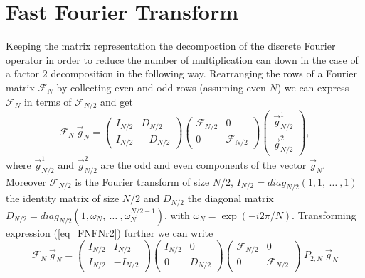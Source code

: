 \section{Fast Fourier Transform} 
\label{sec_fft}
%
Keeping the matrix representation the decompostion of the
discrete Fourier operator in order to reduce the number 
of multiplication can down in the case of a factor $2$
decomposition in the following way.
Rearranging the rows of a Fourier matrix $\mathcal{F}_{N}$
by collecting even and odd rows (assuming even $N$) we
can express $\mathcal{F}_N$ in terms of $\mathcal{F}_{N/2}$
and get
\begin{equation}  \label{eq_FNFNr2}
 \mathcal{F}_{N} \ \vec{g}_{N} 
  =
 \left(
  \begin{array}{cr}
   I_{N/2} &  D_{N/2}
           \\
   I_{N/2} & -D_{N/2}
  \end{array}
 \right)
 \left(
  \begin{array}{cr}
   \mathcal{F}_{N/2} &     0
           \\
        0            & \mathcal{F}_{N/2}
  \end{array}
 \right)
 \left(     
  \begin{array}{c}
   \vec{g}_{N/2}^{1}
    \\
   \vec{g}_{N/2}^{2}
  \end{array} 
 \right),
\end{equation} 
where $\vec{g}^{1}_{N/2}$ and $\vec{g}^{2}_{N/2}$ are the odd and even 
components of the vector $\vec{g}_{N}$. Moreover 
$\mathcal{F}_{N/2}$ is the Fourier transform of size $N/2$, 
$I_{N/2}=diag_{N/2}(1,1, \ \dots \ ,1)$ the identity
matrix of size $N/2$ and $D_{N/2}$ the diagonal matrix 
$D_{N/2} =  diag_{N/2}(1,\omega_{N},\ \dots \ , \omega_{N}^{N/2 - 1})$,
with $\omega_{N} = \exp ( -i 2 \pi / N )$. Transforming expression 
(\ref{eq_FNFNr2}) further we can write
\begin{equation}  \label{eq_FNFNr2_01}
 \mathcal{F}_{N} \ \vec{g}_{N}
  =
 \left(
  \begin{array}{cr}
   I_{N/2} &  I_{N/2}
           \\
   I_{N/2} & -I_{N/2}
  \end{array}
 \right)
 \left(
  \begin{array}{cr}
   I_{N/2} &     0
          \\
      0    &   D_{N/2}
  \end{array}
 \right)
 \left(
  \begin{array}{cr}
   \mathcal{F}_{N/2} &     0
           \\
        0            & \mathcal{F}_{N/2}
  \end{array}
 \right)
  \ P_{2,N} \ \vec{g}_{N}
\end{equation} 
